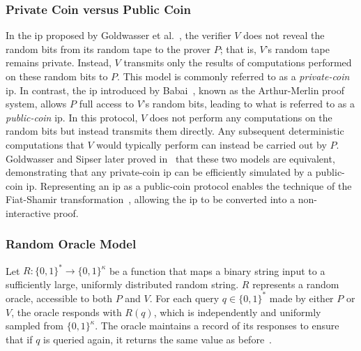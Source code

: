 \subsubsection{Private Coin versus Public Coin}
In the \gls{ip} proposed by Goldwasser et al.~\cite{Goldwasser1985}, the verifier \( V \) does not reveal the random bits from its random tape to the prover \( P \); that is, \( V \)'s random tape remains private. Instead, \( V \) transmits only the results of computations performed on these random bits to \( P \). This model is commonly referred to as a \textit{private-coin} \gls{ip}.  
In contrast, the \gls{ip} introduced by Babai~\cite{Babai85}, known as the Arthur-Merlin proof system, allows \( P \) full access to \( V \)'s random bits, leading to what is referred to as a \textit{public-coin} \gls{ip}. In this protocol, $V$ does not perform any computations on the random bits but instead transmits them directly. Any subsequent deterministic computations that $V$ would typically perform can instead be carried out by $P$.
Goldwasser and Sipser later proved in~\cite{Goldwasser1986Private_vs_Public} that these two models are equivalent, demonstrating that any private-coin \gls{ip} can be efficiently simulated by a public-coin \gls{ip}. Representing an \gls{ip} as a public-coin protocol enables the technique of the Fiat-Shamir transformation~\cite{Fiat1987}, allowing the \gls{ip} to be converted into a non-interactive proof.


\subsubsection{Random Oracle Model}
Let \( R: \{0,1\}^* \rightarrow \{0,1\}^\kappa \) be a function that maps a binary string input to a sufficiently large, uniformly distributed random string. \( R \) represents a random oracle, accessible to both \( P \) and \( V \). For each query \( q \in \{0,1\}^* \) made by either \( P \) or \( V \), the oracle responds with \( R(q) \), which is independently and uniformly sampled from \( \{0,1\}^\kappa \). The oracle maintains a record of its responses to ensure that if \( q \) is queried again, it returns the same value as before~\cite{Thaler2022Proofs}.



